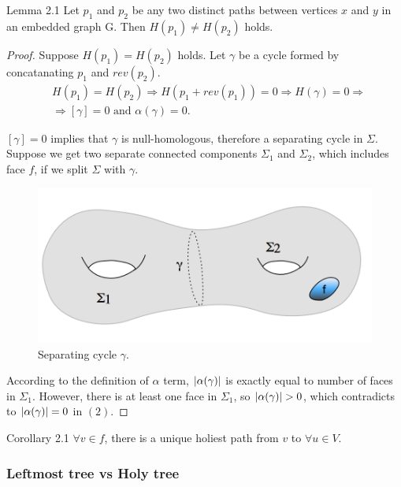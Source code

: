 \documentclass{article}
\begin{document}
\begin{oneshot}{Lemma 2.1}
Let $p_1$ and $p_2$ be any two distinct paths between vertices $x$ and $y$ in an embedded graph G. Then $H(p_1) \neq H(p_2)$ holds. 
\end{oneshot}
\begin{proof}
Suppose $H(p_1) = H(p_2)$ holds. Let $\gamma$ be a cycle formed by concatanating $p_1$ and $rev(p_2)$.
\begin{align}
& H(p_1) = H(p_2) \Rightarrow H(p_1 + rev(p_1)) = 0 \Rightarrow  H(\gamma) = 0 \Rightarrow \\
&  \Rightarrow [\gamma] = 0 \text{ and } \alpha(\gamma) = 0.
\end{align}

$[\gamma] = 0$ implies that $\gamma$ is null-homologous, therefore a separating cycle in $\Sigma$. Suppose we get two separate connected components $\Sigma_1$ and $\Sigma_2$, which includes face $f$, if we split $\Sigma$ with $\gamma$. \\

\begin{figure}[H]
  \label{fig: g2_separating_cycle}
  \centering
  \includegraphics[scale = 0.5]{figures/g2_separating_cycle.png}
  \caption{Separating cycle $\gamma$.}
\end{figure}

According to the definition of $\alpha$ term, $\mathopen| \alpha(\gamma) \mathclose|$ is exactly equal to number of faces in $\Sigma_1$. However, there is at least one face in $\Sigma_1$, so $\mathopen| \alpha(\gamma) \mathclose| > 0$, which contradicts to $\mathopen| \alpha(\gamma) \mathclose| = 0$ in $(2)$.
\end{proof}

\begin{oneshot}{Corollary 2.1}
$\forall v \in f$, there is a unique holiest path from $v$ to $\forall u \in V$.
\end{oneshot}

\subsubsection{Leftmost tree vs Holy tree}
\end{document}
